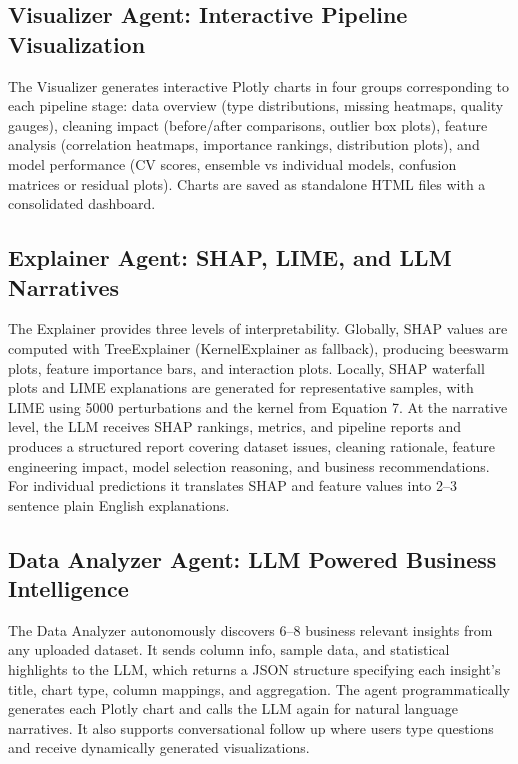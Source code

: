 \documentclass{article}
\begin{document}
\subsection{Visualizer Agent: Interactive Pipeline Visualization}

The Visualizer generates interactive Plotly charts in four groups
corresponding to each pipeline stage: data overview (type distributions,
missing heatmaps, quality gauges), cleaning impact (before/after
comparisons, outlier box plots), feature analysis (correlation heatmaps,
importance rankings, distribution plots), and model performance (CV scores,
ensemble vs individual models, confusion matrices or residual plots).
Charts are saved as standalone HTML files with a consolidated dashboard.

\subsection{Explainer Agent: SHAP, LIME, and LLM Narratives}

The Explainer provides three levels of interpretability. Globally, SHAP
values are computed with TreeExplainer (KernelExplainer as fallback),
producing beeswarm plots, feature importance bars, and interaction plots.
Locally, SHAP waterfall plots and LIME explanations are generated for
representative samples, with LIME using 5000 perturbations and the kernel
from Equation 7. At the narrative level, the LLM receives SHAP rankings,
metrics, and pipeline reports and produces a structured report covering
dataset issues, cleaning rationale, feature engineering impact, model
selection reasoning, and business recommendations. For individual
predictions it translates SHAP and feature values into 2--3 sentence plain
English explanations.

\subsection{Data Analyzer Agent: LLM Powered Business Intelligence}

The Data Analyzer autonomously discovers 6--8 business relevant insights
from any uploaded dataset. It sends column info, sample data, and
statistical highlights to the LLM, which returns a JSON structure
specifying each insight's title, chart type, column mappings, and
aggregation. The agent programmatically generates each Plotly chart and
calls the LLM again for natural language narratives. It also supports
conversational follow up where users type questions and receive dynamically
generated visualizations.
\end{document}
